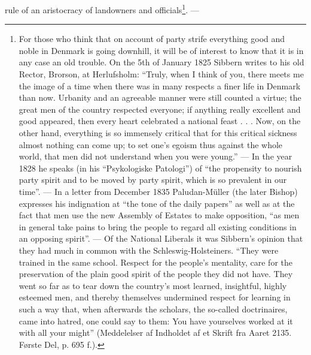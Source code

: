 \documentclass[12pt,a4paper,openany]{book}
\begin{document}
rule of an aristocracy of landowners and officials\footnote{For those who think that on account of party strife everything
good and noble in Denmark is going downhill, it will be of interest
to know that it is in any case an old trouble. On the 5th of January
1825 Sibbern writes to his old Rector, Brorson, at Herlufsholm:
``Truly, when I think of you, there meets me the image of a
time when there was in many respects a finer life in
Denmark than now. Urbanity and an agreeable manner were still
counted a virtue; the great men of the country respected everyone; if anything
really excellent and good appeared, then every heart celebrated a national feast . . .
Now, on the other hand, everything is so immensely critical that for this critical
sickness almost nothing can come up; to set one's egoism thus
against the whole world, that men did not understand when you were young.'' --- In the year
1828 he speaks (in his ``Psykologiske Patologi'') of ``the propensity to
nourish party spirit and to be moved by party spirit, which is so
prevalent in our time''. --- In a letter from December 1835 Paludan-Müller
(the later Bishop) expresses his indignation at ``the tone
of the daily papers'' as well as at the fact that men use the new Assembly of Estates
to make opposition, ``as men in general take pains to
bring the people to regard all existing conditions in an opposing
spirit''. --- Of the National Liberals it was Sibbern's opinion that they
had much in common with the Schleswig-Holsteiners. ``They were trained
in the same school. Respect for the people's mentality, care for the
preservation of the plain good spirit of the people they did not have. They went so far as to tear down the country's most learned, insightful,
highly esteemed men, and thereby themselves undermined respect for learning
in such a way that, when afterwards the scholars,
the so-called doctrinaires, came into hatred, one could say to them: You have
yourselves worked at it with all your might'' (Meddelelser af Indholdet af et Skrift fra Aaret
2135. Første Del, p. 695 f.).}. ---
\end{document}
